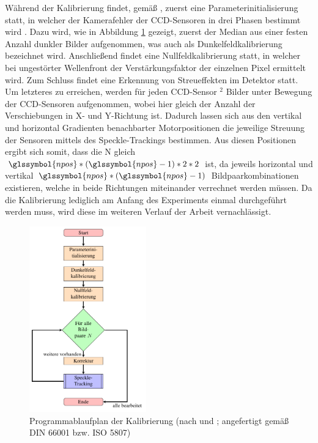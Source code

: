 Während der Kalibrierung findet, gemäß \citeauthor{Ber13}, zuerst eine Parameterinitialisierung statt, in welcher der Kamerafehler der \gls{CCD}-Sensoren in drei Phasen bestimmt wird . Dazu wird, wie in Abbildung \ref{fig:graph_kalibrierung} gezeigt, zuerst der Median aus einer festen Anzahl dunkler Bilder aufgenommen, was auch als Dunkelfeldkalibrierung bezeichnet wird. Anschließend findet eine Nullfeldkalibrierung statt, in welcher bei ungestörter Wellenfront der Verstärkungsfaktor der einzelnen Pixel ermittelt wird. Zum Schluss findet eine Erkennung von Streueffekten im Detektor statt. Um letzteres zu erreichen, werden für jeden \gls{CCD}-Sensor $^2$ Bilder unter Bewegung der \gls{CCD}-Sensoren aufgenommen, wobei  hier gleich der Anzahl der Verschiebungen in X- und Y-Richtung ist. Dadurch lassen sich aus den vertikal und horizontal Gradienten benachbarter Motorpositionen die jeweilige Streuung der Sensoren mittels des Speckle-Trackings bestimmen. Aus diesen  Positionen ergibt sich somit, dass die \gls{N} gleich $\glssymbol{npos}*\left(\glssymbol{npos} - 1\right) * 2 * 2$ ist, da jeweils horizontal und vertikal $\glssymbol{npos}*\left(\glssymbol{npos} - 1\right)$ Bildpaarkombinationen existieren, welche in beide Richtungen miteinander verrechnet werden müssen. Da die Kalibrierung lediglich am Anfang des Experiments einmal durchgeführt werden muss, wird diese im weiteren Verlauf der Arbeit vernachlässigt. 

\begin{figure}[htbp]
	\centering
	\includegraphics[width=0.45\textwidth]{pdf/graph_init}
	\caption[Kalibrierung]{Programmablaufplan der Kalibrierung (nach  und \cite{Coj17}; angefertigt gemäß DIN 66001 bzw. ISO 5807)}
	\label{fig:graph_kalibrierung}
\end{figure}

